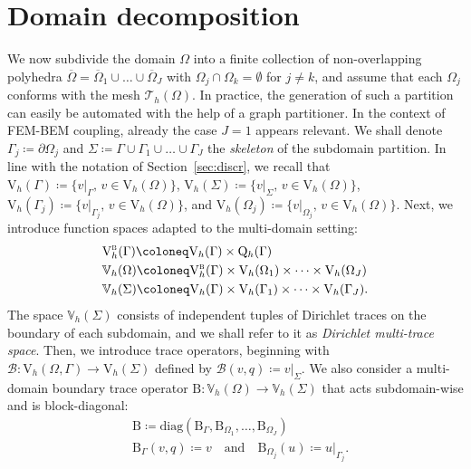 \documentclass[a4paper,11pt]{article}
\newcommand{\mrm}{\mathrm}
\newcommand{\mB}{\mathrm{B}}
\newcommand{\mbV}{\mathbb{V}}
\newcommand{\Vh}{\mathrm{V}_{h}}
\newcommand{\Qh}{\mathrm{Q}_{h}}
\begin{document}
\section{Domain decomposition}\label{sec:ddm}

We now subdivide the domain $\Omega$ into a finite
collection of non-overlapping polyhedra $\overline{\Omega} =
\overline{\Omega}_1\cup \dots\cup \overline{\Omega}_{J}$ with
$\Omega_j\cap \Omega_k = \emptyset$ for $j \neq k$, and assume that
each $\Omega_j$ conforms with the mesh
$\mathcal{T}_h(\Omega)$. 
In practice, the
generation of such a partition can easily be automated with the help
of a graph partitioner.
In the context of FEM-BEM coupling, already
the case $J=1$ appears relevant. 
We shall denote $\Gamma_j\coloneq\partial\Omega_j$
and $\Sigma \coloneq \Gamma \cup \Gamma_1\cup \dots\cup \Gamma_{J}$ the \emph{skeleton} of the subdomain partition. %
In line with the notation of Section~\ref{sec:discr}, we recall that $\Vh(\Gamma) \coloneq \{v\vert_{\Gamma}, \,v \in \Vh(\Omega)\}$, $\Vh(\Sigma) \coloneq \{v\vert_{\Sigma}, \,v \in \Vh(\Omega)\}$, $\Vh(\Gamma_j) \coloneq \{v\vert_{\Gamma_j}, \,v \in \Vh(\Omega)\}$, and $\Vh(\Omega_j) \coloneq \{v\vert_{\Omega_j}, \,v \in \Vh(\Omega)\}$. 
Next, we introduce function spaces
adapted to the multi-domain setting:
\begin{equation*}
  \begin{aligned}
    & \Vh^{\textsc{b}}(\Gamma)\coloneq \Vh(\Gamma)\times \Qh(\Gamma)\\
    & \mbV_h(\Omega) \coloneq \Vh^{\textsc{b}}(\Gamma)\times  \Vh(\Omega_1)\times\cdots\times \Vh(\Omega_J)\\
    & \mbV_h(\Sigma) \coloneq \Vh(\Gamma)\times  \Vh(\Gamma_1)\times\cdots\times \Vh(\Gamma_J).
  \end{aligned}
\end{equation*}
The space $\mbV_h(\Sigma)$ consists of independent tuples of Dirichlet traces on the boundary
of each subdomain, and we shall refer to it as \textit{Dirichlet multi-trace space}.
Then, we introduce trace operators, beginning with
$\mathcal{B}\colon \Vh(\Omega,\Gamma)\to \Vh(\Sigma)$ defined by $\mathcal{B}(v,q)\coloneq
v\vert_{\Sigma}$. 
We also consider a multi-domain boundary trace
operator $\mB\colon \mbV_h(\Omega)\to \mbV_h(\Sigma)$ that acts
subdomain-wise and is block-diagonal:
\begin{equation*}
  \begin{aligned}
    & \mB \coloneq \mrm{diag}(\mB_\Gamma,\mB_{\Omega_1},\dots,\mB_{\Omega_J})\\
    & \mB_\Gamma(v,q)\coloneq v\quad\text{and}\quad \mB_{\Omega_j}(u)\coloneq u\vert_{\Gamma_j}.
  \end{aligned}
\end{equation*}
\end{document}
